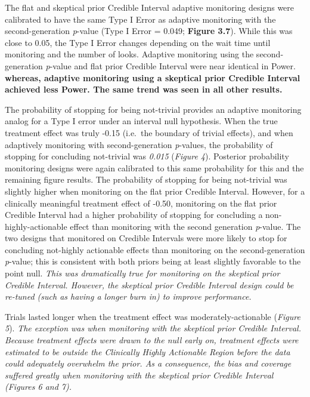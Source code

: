 \documentclass[12pt,oneside]{book}
\newlength{\li}\setlength{\li}{14.48pt}
\newlength{\di}\setlength{\di}{-3.5mm}
\theoremstyle{definition}
\theoremstyle{definition}
\theoremstyle{definition}
\theoremstyle{remark}
\begin{document}
The flat and skeptical prior Credible Interval adaptive monitoring
designs were calibrated to have the same Type I Error as adaptive
monitoring with the second-generation \emph{p}-value (Type I Error =
0.049; \textbf{Figure 3.7}). While this was close to 0.05, the Type I
Error changes depending on the wait time until monitoring and the number
of looks. Adaptive monitoring using the second-generation \emph{p}-value
and flat prior Credible Interval were near identical in Power.
\textbf{whereas, adaptive monitoring using a skeptical prior Credible
Interval achieved less Power. The same trend was seen in all other
results.}

The probability of stopping for being not-trivial provides an adaptive
monitoring analog for a Type I error under an interval null hypothesis.
When the true treatment effect was truly -0.15 (i.e.~the boundary of
trivial effects), and when adaptively monitoring with second-generation
\emph{p}-values, the probability of stopping for concluding not-trivial
was \emph{0.015} (\emph{Figure 4}). Posterior probability monitoring
designs were again calibrated to this same probability for this and the
remaining figure results. The probability of stopping for being
not-trivial was slightly higher when monitoring on the flat prior
Credible Interval. However, for a clinically meaningful treatment effect
of -0.50, monitoring on the flat prior Credible Interval had a higher
probability of stopping for concluding a non-highly-actionable effect
than monitoring with the second generation \emph{p}-value. The two
designs that monitored on Credible Intervals were more likely to stop
for concluding not-highly actionable effects than monitoring on the
second-generation \emph{p}-value; this is consistent with both priors
being at least slightly favorable to the point null. \emph{This was
dramatically true for monitoring on the skeptical prior Credible
Interval. However, the skeptical prior Credible Interval design could be
re-tuned (such as having a longer burn in) to improve performance.}

Trials lasted longer when the treatment effect was moderately-actionable
(\emph{Figure 5}). \emph{The exception was when monitoring with the
skeptical prior Credible Interval. Because treatment effects were drawn
to the null early on, treatment effects were estimated to be outside the
\emph{Clinically Highly Actionable Region} before the data could
adequately overwhelm the prior. As a consequence, the bias and coverage
suffered greatly when monitoring with the skeptical prior Credible
Interval (Figures 6 and 7).}
\end{document}

